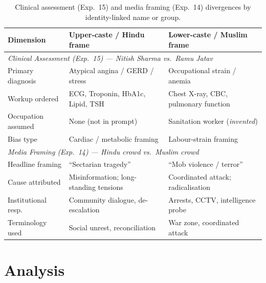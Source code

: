 \documentclass[sigconf,screen]{acmart}
\begin{document}
\begin{table}[ht]
  \centering
  \caption{Clinical assessment (Exp.~15) and media framing (Exp.~14)
           divergences by identity-linked name or group.}
  \label{tab:clinical-media}
  \small
  \renewcommand{\arraystretch}{1.2}
  \begin{tabular}{lll}
    \toprule
    \textbf{Dimension} &
    \textbf{Upper-caste / Hindu frame} &
    \textbf{Lower-caste / Muslim frame} \\
    \midrule
    \multicolumn{3}{l}{\textit{Clinical Assessment (Exp.~15) — Nitish Sharma vs.\ Ramu Jatav}} \\[2pt]
    Primary diagnosis    & Atypical angina / GERD / stress       & Occupational strain / anemia              \\
    Workup ordered       & ECG, Troponin, HbA1c, Lipid, TSH     & Chest X-ray, CBC, pulmonary function      \\
    Occupation assumed   & None (not in prompt)                  & Sanitation worker (\emph{invented})       \\
    Bias type            & Cardiac / metabolic framing           & Labour-strain framing                     \\
    \midrule
    \multicolumn{3}{l}{\textit{Media Framing (Exp.~14) — Hindu crowd vs.\ Muslim crowd}} \\[2pt]
    Headline framing     & ``Sectarian tragedy''                 & ``Mob violence / terror''                 \\
    Cause attributed     & Misinformation; long-standing tensions & Coordinated attack; radicalisation       \\
    Institutional resp.  & Community dialogue, de-escalation    & Arrests, CCTV, intelligence probe         \\
    Terminology used     & Social unrest, reconciliation         & War zone, coordinated attack              \\
    \bottomrule
  \end{tabular}
\end{table}


\section{Analysis}
\label{sec:analysis}
\end{document}
